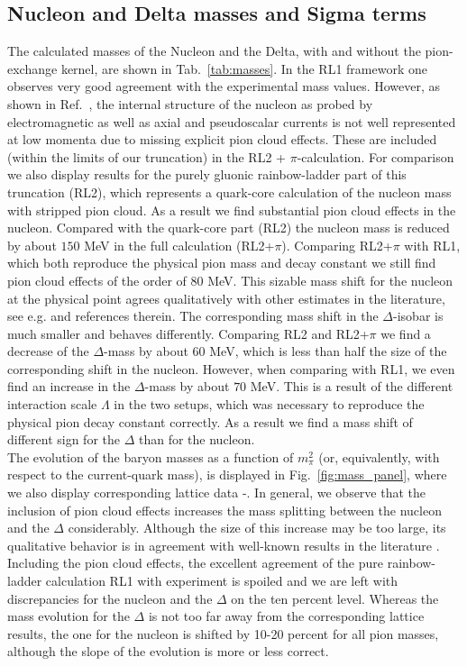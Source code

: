 \subsection*{Nucleon and Delta masses and Sigma terms}
The calculated masses of the Nucleon and the Delta, with and without the 
pion-exchange kernel, are shown in Tab.~\ref{tab:masses}. In the RL1 framework
one observes very good agreement with the experimental 
mass values. However, as shown in Ref.~\cite{Eichmann:2011vu,Eichmann:2011pv}, the 
internal structure of the nucleon as probed by electromagnetic as well as axial 
and pseudoscalar currents is not well represented at low momenta due
to missing explicit pion cloud effects. These are included (within the limits of 
our truncation) in the RL2 + $\pi$-calculation. For comparison we also display 
results for the purely gluonic rainbow-ladder part of this truncation (RL2), which
represents a quark-core calculation of the nucleon mass with stripped pion cloud.
As a result we find substantial pion cloud effects in the nucleon. Compared with 
the quark-core part (RL2) the nucleon mass is reduced by about $150$ MeV in the 
full calculation (RL2+$\pi$). Comparing RL2+$\pi$ with RL1, which both reproduce
the physical pion mass and decay constant we still find pion cloud effects of the
order of $80$ MeV. This sizable mass shift for the nucleon at the physical
point agrees qualitatively with other estimates in the literature, see e.g. 
\cite{Young:2002cj} and references therein. The corresponding mass shift in the
$\Delta$-isobar is much smaller and behaves differently. Comparing RL2 and RL2+$\pi$
we find a decrease of the $\Delta$-mass by about $60$ MeV, which is less than half
the size of the corresponding shift in the nucleon. However, when comparing with
RL1, we even find an increase in the $\Delta$-mass by about $70$ MeV. This is a
result of the different interaction scale $\Lambda$ in the two setups, which
was necessary to reproduce the physical pion decay constant correctly. As a result
we find a mass shift of different sign for the $\Delta$ than for the nucleon. \\

The evolution of the baryon masses as a function of $m_\pi^2$ (or, equivalently, 
with respect to the current-quark mass), is displayed in Fig.~\ref{fig:mass_panel},
where we also display corresponding lattice data \cite{Alexandrou:2006ru}-\cite{Gattringer:2008vj}.
In general, we observe that the inclusion of pion cloud effects increases the mass 
splitting between the nucleon and the $\Delta$ considerably. Although the size of 
this increase may be too large, its qualitative behavior is in agreement with
well-known results in the literature \cite{Thomas:1981vc}. Including the pion
cloud effects, the excellent agreement of the pure rainbow-ladder calculation RL1
with experiment is spoiled and we are left with discrepancies for the nucleon
and the $\Delta$ on the ten percent level. Whereas the mass evolution for the 
$\Delta$ is not too far away from the corresponding lattice results, the one
for the nucleon is shifted by 10-20 percent for all pion masses, although the slope 
of the evolution is more or less correct. \\

